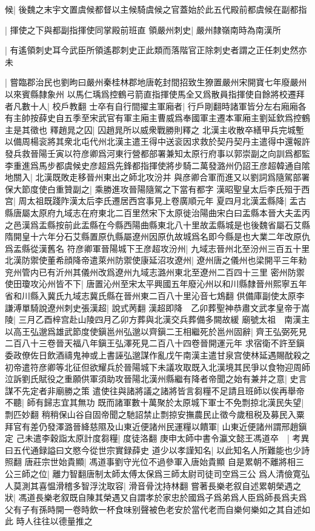 候|{
	後魏之末宇文置虞候都督以主候騎虞候之官蓋始於此五代殿前都虞候在副都指}


|{
	揮使之下與都副指揮使同掌殿前班直}
領嚴州刺史|{
	嚴州隸嶺南時為南漢所}


|{
	有遙領刺史耳今武臣所領遙郡刺史正此類而落階官正除刺史者謂之正任刺史然亦未}


|{
	嘗臨郡治民也劉昫曰嚴州秦桂林郡地唐乾封間招致生獠置嚴州宋開寶七年廢嚴州以來賓縣隸象州}
以馬仁瑀爲控鶴弓箭直指揮使馬全又爲散員指揮使自餘將校遷拜者凡數十人|{
	校戶教翻}
士卒有自行間擢主軍廂者|{
	行戶剛翻時諸軍皆分左右廂廂各有主帥按薛史自五季至宋武官有軍主廂主曹威爲奉國軍主遷本軍廂主劉延欽爲控鶴主是其徵也}
釋趙晁之囚|{
	囚趙晁所以威衆戰勝則釋之}
北漢主收散卒繕甲兵完城塹以備周楊衮將其衆北屯代州北漢主遣王得中送衮因求救於契丹契丹主遣得中還報許發兵救晉陽壬寅以符彦卿爲河東行營都部署兼知太原行府事以郭崇副之向訓爲都監李重進爲馬步都虞候史彦超爲先鋒都指揮使將步騎二萬發潞州仍詔王彦超韓通自隂地關入|{
	北漢既敗走移晉州東出之師北攻汾并}
與彦卿合軍而進又以劉詞爲隨駕部署保大節度使白重贊副之|{
	乘勝進攻晉陽隨駕之下當有都字}
漢昭聖皇太后李氏殂于西宫|{
	周太祖既踐阼漢太后李氏遷居西宫事見上卷廣順元年}
夏四月北漢盂縣降|{
	盂古縣唐屬太原府九域志在府東北二百里然宋下太原徙治陽曲宋白曰盂縣本晉大夫盂丙之邑漢爲盂縣按前此盂縣在今縣西陽曲縣東北八十里故盂縣城是也後魏省屬石艾縣隋開皇十六年分石艾縣置原仇縣屬遼州因原仇故城爲名即今縣是也大業二年改原仇爲盂縣從漢舊名}
符彦卿軍晉陽城下王彦超攻汾州|{
	九域志晉州北至汾州三百五十里}
北漢防禦使董希顔降帝遣萊州防禦使康延沼攻遼州|{
	遼州唐之儀州也梁開平三年勑兖州管内已有沂州其儀州改爲遼州九域志潞州東北至遼州二百四十三里}
密州防禦使田瓊攻沁州皆不下|{
	唐置沁州至宋太平興國五年廢沁州以和川縣隸晉州熙寧五年省和川縣入冀氏九域志冀氏縣在晉州東二百八十里沁音七鴆翻}
供備庫副使太原李謙溥單騎說遼州刺史張漢超|{
	說式苪翻}
漢超即降　乙卯葬聖神恭肅文武孝皇帝于嵩陵|{
	三月乙酉梓宫赴山陵四月乙卯方葬與北漢交兵葬備多闕故緩}
廟號太祖　南漢主以高王弘邈爲雄武節度使鎭邕州弘邈以齊鎭二王相繼死於邕州固辭|{
	齊王弘弼死見二百八十三卷晉天福八年鎭王弘澤死見二百八十四卷晉開運元年}
求宿衛不許至鎭委政僚佐日飲酒禱鬼神或上書誣弘邈謀作亂戊午南漢主遣甘泉宫使林延遇賜酖殺之　初帝遣符彦卿等北征但欲耀兵於晉陽城下未議攻取既入北漢境其民爭以食物迎周師泣訴劉氏賦役之重願供軍須助攻晉陽北漢州縣繼有降者帝聞之始有兼并之意|{
	史言謀不先定者非廟勝之策}
遣使往與諸將議之諸將皆言芻糧不足請且班師以俟再舉帝不聽|{
	師有歸志宜其無功}
既而諸軍數十萬聚於太原城下軍士不免剽掠北漢民失望|{
	剽匹妙翻}
稍稍保山谷自固帝聞之馳詔禁止剽掠安撫農民止徵今歲租税及募民入粟拜官有差仍發澤潞晉絳慈隰及山東近便諸州民運糧以饋軍|{
	山東近便諸州謂邢趙鎭定}
己未遣李穀詣太原計度芻糧|{
	度徒洛翻}
庚申太師中書令瀛文懿王馮道卒　|{
	考異曰五代通録謚曰文愍今從世宗實録薛史}
道少以孝謹知名|{
	以此知名人所難能也少詩照翻}
唐莊宗世始貴顯|{
	馮道事劉守光位不過參軍入唐始貴顯}
自是累朝不離將相三公三師之位|{
	離力智翻唐制太師太傅太保爲三師太尉司徒司空爲三公}
爲人清儉寛弘人莫測其喜愠滑稽多智浮沈取容|{
	滑音骨沈持林翻}
嘗著長樂老叙自述累朝榮遇之狀|{
	馮道長樂老叙既自陳其榮遇又自謂孝於家忠於國爲子爲弟爲人臣爲師長爲夫爲父有子有孫時開一卷時飲一杯食味别聲被色老安於當代老而自樂何樂如之其自述如此}
時人往往以德量推之

